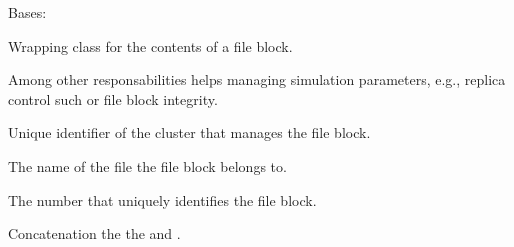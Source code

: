 \documentclass[letterpaper,10pt,english]{sphinxmanual}
\begin{document}
\begin{fulllineitems}
\label{\detokenize{app.domain.helpers:app.domain.helpers.smart_dataclasses.FileBlockData}}
Bases: 

Wrapping class for the contents of a file block.

Among other responsabilities  helps managing simulation
parameters, e.g., replica control such or file block integrity.

\begin{fulllineitems}
\label{\detokenize{app.domain.helpers:app.domain.helpers.smart_dataclasses.FileBlockData.hive_id}}
Unique identifier of the cluster that manages the file block.

\end{fulllineitems}


\begin{fulllineitems}
\label{\detokenize{app.domain.helpers:app.domain.helpers.smart_dataclasses.FileBlockData.name}}
The name of the file the file block belongs to.

\end{fulllineitems}


\begin{fulllineitems}
\label{\detokenize{app.domain.helpers:app.domain.helpers.smart_dataclasses.FileBlockData.number}}
The number that uniquely identifies the file block.

\end{fulllineitems}


\begin{fulllineitems}
\label{\detokenize{app.domain.helpers:app.domain.helpers.smart_dataclasses.FileBlockData.id}}
Concatenation the the  and .


\end{fulllineitems}
\end{fulllineitems}
\end{document}

